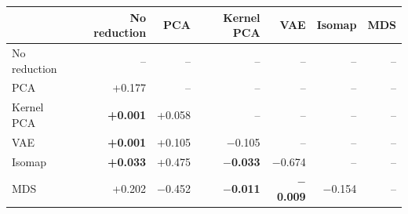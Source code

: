 \begin{tabular}{lrrrrrr}
\toprule
 & No reduction & PCA & Kernel PCA & VAE & Isomap & MDS \\
\midrule
No reduction & -- & -- & -- & -- & -- & -- \\
PCA & +0.177 & -- & -- & -- & -- & -- \\
Kernel PCA & {\bfseries\boldmath +0.001} & +0.058 & -- & -- & -- & -- \\
VAE & {\bfseries\boldmath +0.001} & +0.105 & $-$0.105 & -- & -- & -- \\
Isomap & {\bfseries\boldmath +0.033} & +0.475 & {\bfseries\boldmath $-$0.033} & $-$0.674 & -- & -- \\
MDS & +0.202 & $-$0.452 & {\bfseries\boldmath $-$0.011} & {\bfseries\boldmath $-$0.009} & $-$0.154 & -- \\
\bottomrule
\end{tabular}
